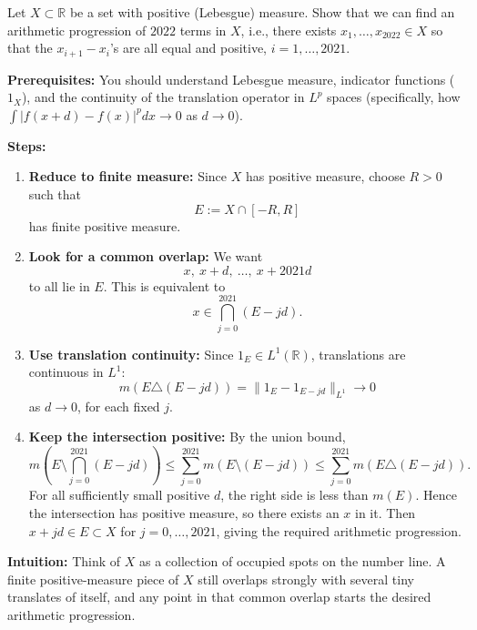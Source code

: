 \begin{exercise}
\label{analysis:2022:3}
Let $X\subset\mathbb{R}$ be a set with positive (Lebesgue) measure. Show that we can find an arithmetic progression of $2022$ terms in $X$, i.e., there exists $x_1,\dots,x_{2022}\in X$ so that the $x_{i+1}-x_i$'s are all equal and positive, $i=1,\ldots,2021$.
\end{exercise}

\begin{solution}
\textbf{Prerequisites:}
You should understand Lebesgue measure, indicator functions ($1_X$), and the continuity of the translation operator in $L^p$ spaces (specifically, how $\int |f(x+d) - f(x)|^p dx \to 0$ as $d \to 0$).


\textbf{Steps:}
\begin{enumerate}
    \item \textbf{Reduce to finite measure:} Since $X$ has positive measure, choose $R>0$ such that
    \[
    E:=X\cap[-R,R]
    \]
    has finite positive measure.

    \item \textbf{Look for a common overlap:} We want
    \[
    x,\ x+d,\ \ldots,\ x+2021d
    \]
    to all lie in $E$. This is equivalent to
    \[
    x\in \bigcap_{j=0}^{2021}(E-jd).
    \]

    \item \textbf{Use translation continuity:} Since $1_E\in L^1(\mathbb{R})$, translations are continuous in $L^1$:
    \[
    m(E\triangle(E-jd))
    =
    \|1_E-1_{E-jd}\|_{L^1}
    \to0
    \]
    as $d\to0$, for each fixed $j$.

    \item \textbf{Keep the intersection positive:} By the union bound,
    \[
    m\left(E\setminus\bigcap_{j=0}^{2021}(E-jd)\right)
    \leq
    \sum_{j=0}^{2021}m(E\setminus(E-jd))
    \leq
    \sum_{j=0}^{2021}m(E\triangle(E-jd)).
    \]
    For all sufficiently small positive $d$, the right side is less than $m(E)$. Hence the intersection has positive measure, so there exists an $x$ in it. Then $x+jd\in E\subset X$ for $j=0,\ldots,2021$, giving the required arithmetic progression.
\end{enumerate}


\textbf{Intuition:}
Think of $X$ as a collection of occupied spots on the number line. A finite positive-measure piece of $X$ still overlaps strongly with several tiny translates of itself, and any point in that common overlap starts the desired arithmetic progression.
\end{solution}

